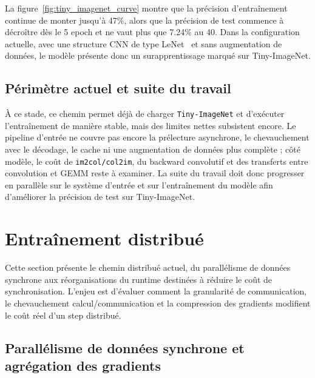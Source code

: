 \documentclass[a4paper,11pt,oneside]{article}
\begin{document}
La figure~\ref{fig:tiny_imagenet_curve} montre que la précision d'entraînement continue de monter jusqu'à 47\%, alors que la précision de test commence à décroître dès le 5\ieme{} epoch et ne vaut plus que 7.24\% au 40\ieme{}. Dans la configuration actuelle, avec une structure CNN de type LeNet~\cite{lecun1998} et sans augmentation de données, le modèle présente donc un surapprentissage marqué sur Tiny-ImageNet.

\subsection{Périmètre actuel et suite du travail}

À ce stade, ce chemin permet déjà de charger \texttt{Tiny-ImageNet} et d'exécuter l'entraînement de manière stable, mais des limites nettes subsistent encore. Le pipeline d'entrée ne couvre pas encore la prélecture asynchrone, le chevauchement avec le décodage, le cache ni une augmentation de données plus complète ; côté modèle, le coût de \texttt{im2col/col2im}, du backward convolutif et des transferts entre convolution et GEMM reste à examiner. La suite du travail doit donc progresser en parallèle sur le système d'entrée et sur l'entraînement du modèle afin d'améliorer la précision de test sur Tiny-ImageNet.

\section{Entraînement distribué}

Cette section présente le chemin distribué actuel, du parallélisme de données synchrone aux réorganisations du runtime destinées à réduire le coût de synchronisation. L'enjeu est d'évaluer comment la granularité de communication, le chevauchement calcul/communication et la compression des gradients modifient le coût réel d'un step distribué.

\subsection{Parallélisme de données synchrone et agrégation des gradients}
\end{document}
